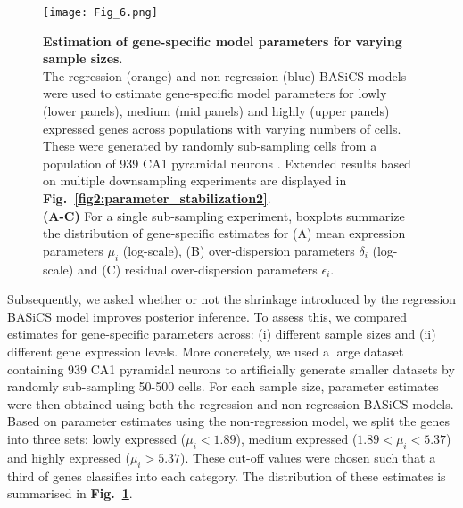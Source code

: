 \begin{figure}[!h]
\centering
\texttt{[image: Fig\_6.png]}
\caption{\textbf{Estimation of gene-specific model parameters for varying sample sizes}.\\
The regression (orange) and non-regression (blue) BASiCS models were used to estimate gene-specific model parameters for lowly (lower panels), medium (mid panels) and highly (upper panels) expressed genes across populations with varying numbers of cells. These were generated by randomly sub-sampling cells from a population of 939 CA1 pyramidal neurons \citep{Zeisel2015}. Extended results based on multiple downsampling experiments are displayed in \textbf{Fig.~\ref{fig2:parameter_stabilization2}}.  \\
\textbf{(A-C)} For a single sub-sampling experiment, boxplots summarize the distribution of gene-specific estimates for (A) mean expression parameters $\mu_i$ (log-scale), (B) over-dispersion parameters $\delta_i$ (log-scale) and (C) residual over-dispersion parameters $\epsilon_i$.}
\label{fig2:parameter_stabilization}
\end{figure}

Subsequently, we asked whether or not the shrinkage introduced by the regression BASiCS model improves posterior inference. To assess this, we compared estimates for gene-specific parameters across: (i) different sample sizes and (ii) different gene expression levels. More concretely, we used a large dataset containing 939 CA1 pyramidal neurons \citep{Zeisel2015} to artificially generate smaller datasets by randomly sub-sampling 50-500 cells. For each sample size, parameter estimates were then obtained using both the regression and non-regression BASiCS models. 
Based on parameter estimates using the non-regression model, we split the genes into three sets: lowly expressed ($\mu_i<1.89$), medium expressed ($1.89<\mu_i<5.37$) and highly expressed ($\mu_i>5.37$). These cut-off values were chosen such that a third of genes classifies into each category. The distribution of these estimates is summarised in \textbf{Fig.~\ref{fig2:parameter_stabilization}}. \\

